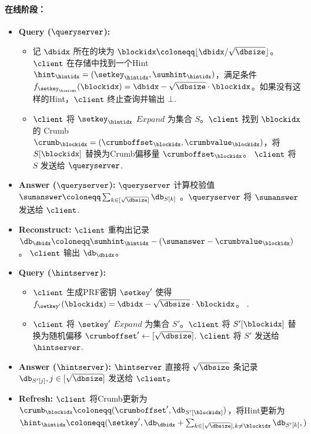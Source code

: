 \begin{mdframed}
        \paragraph{在线阶段：}
        \begin{itemize}
            \item \textbf{Query ($\queryserver$):}
                  \begin{itemize}
                      \item 记 $\dbidx$ 所在的块为 $\blockidx\coloneqq \lfloor \dbidx/\sqrt{\dbsize}\rfloor$。 $\client$ 在存储中找到一个Hint $\hint_\hintidx = (\setkey_\hintidx,\sumhint_\hintidx)$，满足条件 $f_{\setkey_\hintidx}(\blockidx) = \dbidx-\sqrt{\dbsize}\cdot \blockidx$。如果没有这样的Hint，$\client$ 终止查询并输出 $\bot$.
                      \item $\client$ 将 $\setkey_\hintidx$ $Expand$ 为集合 $S$。$\client$ 找到 $\blockidx$ 的 Crumb $\crumb_\blockidx=(\crumboffset_\blockidx, \crumbvalue_\blockidx)$，将 $S[\blockidx]$ 替换为Crumb偏移量 $\crumboffset_\blockidx$。  $\client$ 将 $S$  发送给 $\queryserver$.
                  \end{itemize}
            \item \textbf{Answer ($\queryserver$):} $\queryserver$ 计算校验值 $\sumanswer\coloneqq \sum_{k\in [\sqrt{\dbsize}]}\db_{S[k]}$ 。$\queryserver$ 将 $\sumanswer$  发送给 $\client$.
            \item \textbf{Reconstruct:} $\client$ 重构出记录 $\db_\dbidx \coloneqq  \sumhint_\hintidx-(\sumanswer-\crumbvalue_\blockidx)$。  $\client$ 输出 $\db_\dbidx$。
            \item \textbf{Query ($\hintserver$):}
                  \begin{itemize}
                      \item $\client$ 生成PRF密钥 $\setkey'$ 使得 $f_{\setkey'}(\blockidx) = \dbidx-\sqrt{\dbsize}\cdot \blockidx$。 .
                      \item $\client$ 将 $\setkey'$ $Expand$ 为集合 $S'$。$\client$ 将 $S'[\blockidx]$ 替换为随机偏移 $\crumboffset' \leftarrow [\sqrt{\dbsize}]$. $\client$ 将 $S'$ 发送给 $\hintserver$.
                  \end{itemize}
            \item \textbf{Answer ($\hintserver$):} $\hintserver$ 直接将 $\sqrt{\dbsize}$ 条记录 $\db_{S'[j]}, j\in [\sqrt{\dbsize}]$ 发送给 $\client$。
            \item \textbf{Refresh:} $\client$ 将Crumb更新为 $\crumb_\blockidx \coloneqq  (\crumboffset', \db_{S'[\blockidx]})$，将Hint更新为 $\hint_\hintidx \coloneqq  (\setkey',\db_\dbidx + \sum_{k\in [\sqrt{\dbsize}],k\neq \blockidx}\db_{S'[k]}, )$
        \end{itemize}
    \end{mdframed}
    \label{fig:two-server}
